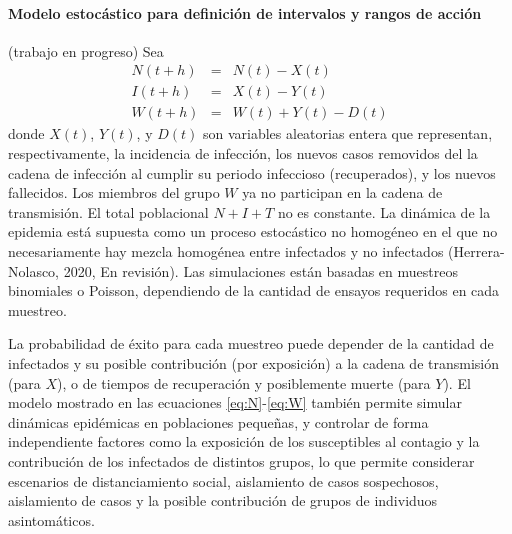\documentclass[8pt]{article}
\begin{document}
\paragraph{Modelo estocástico para definición de intervalos y rangos de acción} (trabajo en progreso)
Sea 
\begin{eqnarray}
N(t+h) &=& N(t) - X(t)
 \label{eq:N} \\
I(t+h) &=& X(t) - Y(t)
\label{eq:I}\\
W(t+h) &=& W(t) + Y(t) - D(t)
\label{eq:W}
\end{eqnarray}
donde $X(t)$, $Y(t)$, y $D(t)$ son variables aleatorias entera que representan, respectivamente, la incidencia de infección, los nuevos casos removidos del la cadena de infección al cumplir su periodo infeccioso (recuperados), y los nuevos fallecidos. Los miembros del grupo $W$ ya no participan en la cadena de transmisión. El total poblacional $N+I+T$ no es constante. La dinámica de la epidemia está supuesta como un proceso estocástico no homogéneo en el que no necesariamente hay mezcla homogénea entre infectados y no infectados (Herrera-Nolasco, 2020, En revisión). Las simulaciones están basadas en muestreos binomiales o Poisson, dependiendo de la cantidad de ensayos requeridos en cada muestreo.

 La probabilidad de éxito para cada muestreo puede depender de la cantidad de infectados y su posible contribución (por exposición) a la cadena de transmisión (para $X$), o de tiempos de recuperación y posiblemente muerte (para $Y$). El modelo mostrado en las ecuaciones \eqref{eq:N}-\eqref{eq:W} también permite simular dinámicas epidémicas en poblaciones pequeñas, y controlar de forma independiente  factores como la exposición de los susceptibles al contagio y la contribución de los infectados de distintos grupos, lo que permite considerar escenarios de distanciamiento social, aislamiento de casos sospechosos, aislamiento de casos y la posible contribución de grupos de individuos asintomáticos.
\end{document}
